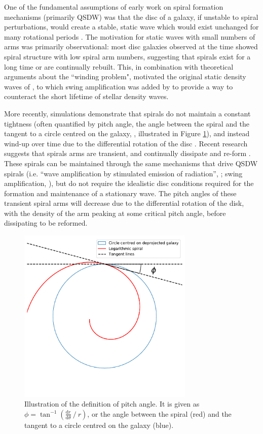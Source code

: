 One of the fundamental assumptions of early work on spiral formation mechanisms (primarily QSDW) was that the disc of a galaxy, if unstable to spiral perturbations, would create a stable, static wave which would exist unchanged for many rotational periods \citep{1964ApJ...140..646L}. The motivation for static waves with small numbers of arms was primarily observational: most disc galaxies observed at the time showed spiral structure with low spiral arm numbers, suggesting that spirals exist for a long time or are continually rebuilt. This, in combination with theoretical arguments about the ``winding problem", motivated the original static density waves of \citet{1964ApJ...140..646L}, to which swing amplification was added by \citet{Toomre1981}  to provide a way to counteract the short lifetime of stellar density waves.

More recently, simulations demonstrate that spirals do not maintain a constant tightness (often quantified by pitch angle, the angle between the spiral and the tangent to a circle centred on the galaxy, \citealt{1987gady.book.....B}, illustrated in Figure \ref{fig:pitch-angle-example}), and instead wind-up over time due to the differential rotation of the disc \citep{2013ApJ...763...46B}. Recent research suggests that spirals arms are transient, and continually dissipate and re-form \citep{2014PASA...31...35D}. These spirals can be maintained through the same mechanisms that drive QSDW spirals (i.e. ``wave amplification by stimulated emission of radiation'', \citealt{1976ApJ...205..363M}; swing amplification, \citealt{1965MNRAS.130..125G}), but do not require the idealistic disc conditions required for the formation and maintenance of a stationary wave. The pitch angles of these transient spiral arms will decrease due to the differential rotation of the disk, with the density of the arm peaking at some critical pitch angle, before dissipating to be reformed.

\begin{figure}
  \includegraphics[width=8.4cm]{plots/pitch-angle-explanation.pdf}
  \caption{Illustration of the definition of pitch angle. It is given as $\phi = \tan^{-1}\left(\frac{\mathrm{d}r}{\mathrm{d}\theta}\ /\ r\right)$, or the angle between the spiral (red) and the tangent to a circle centred on the galaxy (blue).}
  \label{fig:pitch-angle-example}
\end{figure}

